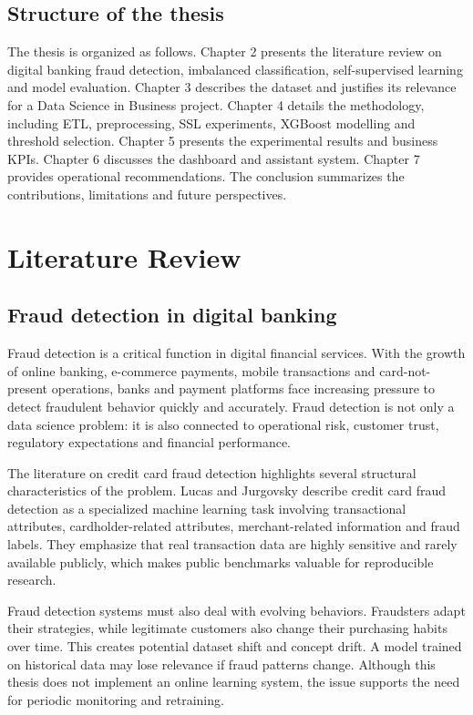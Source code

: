 ﻿\documentclass[12pt,a4paper,oneside]{report}
\begin{document}
\section{Structure of the thesis}

The thesis is organized as follows. Chapter 2 presents the literature review on digital banking fraud detection, imbalanced classification, self-supervised learning and model evaluation. Chapter 3 describes the dataset and justifies its relevance for a Data Science in Business project. Chapter 4 details the methodology, including ETL, preprocessing, SSL experiments, XGBoost modelling and threshold selection. Chapter 5 presents the experimental results and business KPIs. Chapter 6 discusses the dashboard and assistant system. Chapter 7 provides operational recommendations. The conclusion summarizes the contributions, limitations and future perspectives.

\chapter{Literature Review}

\section{Fraud detection in digital banking}

Fraud detection is a critical function in digital financial services. With the growth of online banking, e-commerce payments, mobile transactions and card-not-present operations, banks and payment platforms face increasing pressure to detect fraudulent behavior quickly and accurately. Fraud detection is not only a data science problem: it is also connected to operational risk, customer trust, regulatory expectations and financial performance.

The literature on credit card fraud detection highlights several structural characteristics of the problem. Lucas and Jurgovsky \cite{lucas2020survey} describe credit card fraud detection as a specialized machine learning task involving transactional attributes, cardholder-related attributes, merchant-related information and fraud labels. They emphasize that real transaction data are highly sensitive and rarely available publicly, which makes public benchmarks valuable for reproducible research.

Fraud detection systems must also deal with evolving behaviors. Fraudsters adapt their strategies, while legitimate customers also change their purchasing habits over time. This creates potential dataset shift and concept drift. A model trained on historical data may lose relevance if fraud patterns change. Although this thesis does not implement an online learning system, the issue supports the need for periodic monitoring and retraining.
\end{document}
